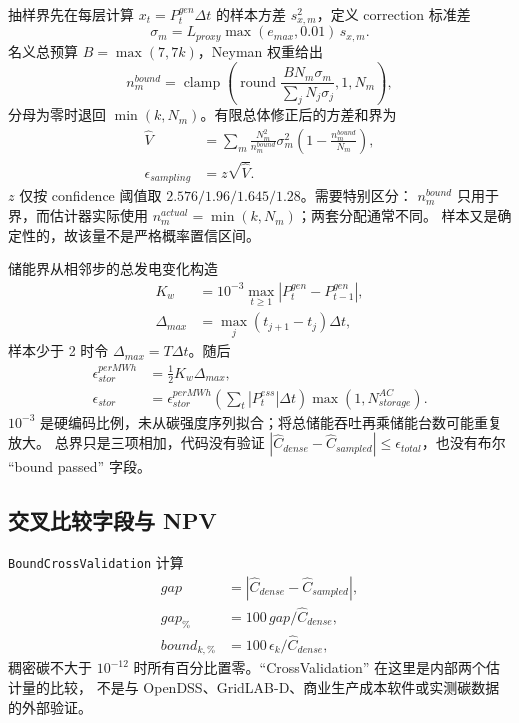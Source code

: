 抽样界先在每层计算 $x_t=P_t^{gen}\Delta t$ 的样本方差 $s_{x,m}^2$，定义 correction 标准差
\begin{equation}
 \sigma_m=L_{proxy}\max(e_{max},0.01)\,s_{x,m}.
\end{equation}
名义总预算 $B=\max(7,7k)$，Neyman 权重给出
\begin{equation}
 n_m^{bound}=\operatorname{clamp}\!\left(
 \operatorname{round}\frac{B N_m\sigma_m}{\sum_jN_j\sigma_j},1,N_m\right),
\end{equation}
分母为零时退回 $\min(k,N_m)$。有限总体修正后的方差和界为
\begin{align}
 \widehat V&=\sum_m\frac{N_m^2}{n_m^{bound}}\sigma_m^2
 \left(1-\frac{n_m^{bound}}{N_m}\right),\\
 \epsilon_{sampling}&=z\sqrt{\widehat V}.
\end{align}
$z$ 仅按 confidence 阈值取 $2.576/1.96/1.645/1.28$。需要特别区分：
$n_m^{bound}$ 只用于界，而估计器实际使用 $n_m^{actual}=\min(k,N_m)$；两套分配通常不同。
样本又是确定性的，故该量不是严格概率置信区间。

储能界从相邻步的总发电变化构造
\begin{align}
 K_w&=10^{-3}\max_{t\ge1}|P_t^{gen}-P_{t-1}^{gen}|,\\
 \Delta_{max}&=\max_j(t_{j+1}-t_j)\Delta t,
\end{align}
样本少于 2 时令 $\Delta_{max}=T\Delta t$。随后
\begin{align}
 \epsilon_{stor}^{perMWh}&=\tfrac12K_w\Delta_{max},\\
 \epsilon_{stor}&=\epsilon_{stor}^{perMWh}
 \left(\sum_t|P_t^{ess}|\Delta t\right)\max(1,N_{storage}^{AC}).
\end{align}
$10^{-3}$ 是硬编码比例，未从碳强度序列拟合；将总储能吞吐再乘储能台数可能重复放大。
总界只是三项相加，代码没有验证
$|\widehat C_{dense}-\widehat C_{sampled}|\le\epsilon_{total}$，也没有布尔 ``bound passed'' 字段。

\subsection{交叉比较字段与 NPV}
\texttt{BoundCrossValidation} 计算
\begin{align}
 gap&=|\widehat C_{dense}-\widehat C_{sampled}|,\\
 gap_{\%}&=100\,gap/\widehat C_{dense},\\
 bound_{k,\%}&=100\,\epsilon_k/\widehat C_{dense},
\end{align}
稠密碳不大于 $10^{-12}$ 时所有百分比置零。``CrossValidation'' 在这里是内部两个估计量的比较，
不是与 OpenDSS、GridLAB-D、商业生产成本软件或实测碳数据的外部验证。

